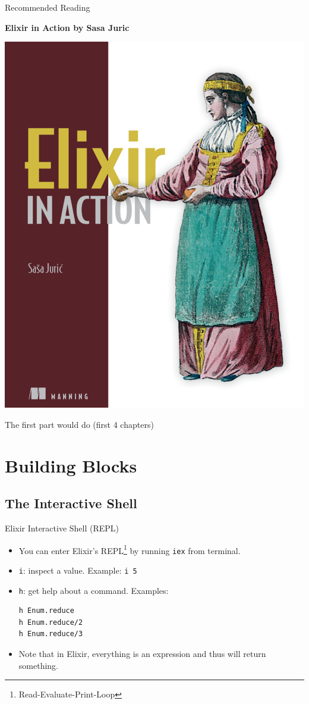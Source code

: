 \documentclass[12pt]{beamer}
\begin{document}
\begin{frame}{Recommended Reading}
  \begin{center}
    \textbf{Elixir in Action by Sasa Juric}

    \includegraphics[height=0.5\textheight]{sasajuric}

    The first part would do (first 4 chapters)
  \end{center}
\end{frame}


\section{Building Blocks}
\subsection{The Interactive Shell}
\begin{frame}[fragile]{Elixir Interactive Shell (REPL)}
  \begin{itemize}
    \item You can enter Elixir's REPL\footnote{Read-Evaluate-Print-Loop} by running \texttt{iex} from terminal.
    \item \texttt{i}: inspect a value. Example: \texttt{i 5}
    \item \texttt{h}: get help about a command. Examples:
          \begin{verbatim}
h Enum.reduce
h Enum.reduce/2
h Enum.reduce/3
  \end{verbatim}
    \item Note that in Elixir, everything is an expression and thus will return something.
  \end{itemize}
\end{frame}
\end{document}
